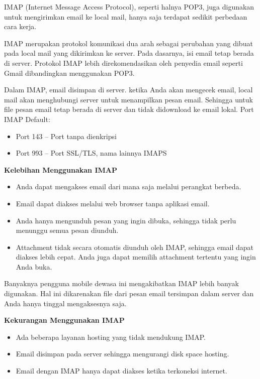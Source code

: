 IMAP (Internet Message Access Protocol), seperti halnya POP3, juga digunakan untuk mengirimkan email ke local mail, hanya saja terdapat sedikit perbedaan cara kerja. \par
\vspace{12pt}
IMAP merupakan protokol komunikasi dua arah sebagai perubahan yang dibuat pada local mail yang dikirimkan ke server. Pada dasarnya, isi email tetap berada di server. Protokol IMAP lebih direkomendasikan oleh penyedia email seperti Gmail dibandingkan menggunakan POP3. \par
\vspace{12pt}
Dalam IMAP, email disimpan di server. ketika Anda akan mengecek email, local mail akan menghubungi server untuk menampilkan pesan email. Sehingga untuk file pesan email tetap berada di server dan tidak didownload ke email lokal. Port IMAP Default: \par
\noindent 
\begin{itemize}
\item Port 143 – Port tanpa dienkripsi \par
\noindent 
\item Port 993 – Port SSL/TLS, nama lainnya IMAPS\end{itemize}
 \par
\vspace{12pt}
\textbf{Kelebihan Menggunakan IMAP} \par
\noindent 
\begin{itemize}
\item Anda dapat mengakses email dari mana saja melalui perangkat berbeda. \par
\noindent 
\item Email dapat diakses melalui web browser tanpa aplikasi email. \par
\noindent 
\item Anda hanya mengunduh pesan yang ingin dibuka, sehingga tidak perlu menunggu semua pesan diunduh. \par
\noindent 
\item Attachment tidak secara otomatis diunduh oleh IMAP, sehingga email dapat diakses lebih cepat. Anda juga dapat memilih attachment tertentu yang ingin Anda buka.\end{itemize}
 \par
Banyaknya pengguna mobile dewasa ini mengakibatkan IMAP lebih banyak digunakan. Hal ini dikarenakan file dari pesan email tersimpan dalam server dan Anda hanya tinggal mengaksesnya saja. \par
\vspace{12pt}
\textbf{Kekurangan Menggunakan IMAP} \par
\noindent 
\begin{itemize}
\item Ada beberapa layanan hosting yang tidak mendukung IMAP. \par
\noindent 
\item Email disimpan pada server sehingga mengurangi disk space hosting. \par
\noindent 
\item Email dengan IMAP hanya dapat diakses ketika terkoneksi internet.\end{itemize}
 \par
\vspace{12pt}
\noindent 
